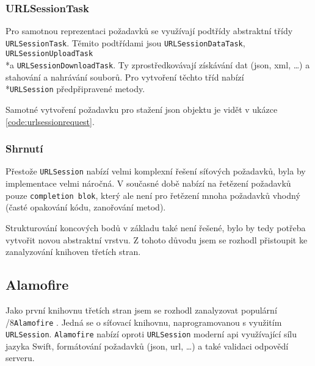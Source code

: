
\subsubsection*{URLSessionTask}

Pro samotnou reprezentaci požadavků se využívají podtřídy abstraktní třídy \texttt{URLSessionTask}.
Těmito podtřídami jsou \texttt{URLSessionDataTask}, \texttt{URLSessionUploadTask}\\*a \texttt{URLSessionDownloadTask}.
Ty zprostředkovávají získávání dat (\acrshort{json}, \acrshort{xml}, \ldots) a stahování a nahrávání souborů.
Pro vytvoření těchto tříd nabízí\\*\texttt{URLSession} předpřipravené metody.

Samotné vytvoření požadavku pro stažení \acrshort{json} objektu je vidět v ukázce \ref{code:urlsessionrequest}.


\subsubsection*{Shrnutí}

Přestože \texttt{URLSession} nabízí velmi komplexní řešení síťových požadavků, byla by implementace velmi náročná.
V současné době nabízí na řetězení požadavků pouze \texttt{completion blok}, který ale není pro řetězení mnoha požadavků vhodný (časté opakování kódu, zanořování metod).

Strukturování koncových bodů v základu také není řešené, bylo by tedy potřeba vytvořit novou abstraktní vrstvu.
Z tohoto důvodu jsem se rozhodl přistoupit ke zanalyzování knihoven třetích stran.

\subsection{Alamofire}

Jako první knihovnu třetích stran jsem se rozhodl zanalyzovat populární\\/8\texttt{Alamofire} \cite{github-alamofire}.
Jedná se o síťovací knihovnu, naprogramovanou s využitím \texttt{URLSession}.
\texttt{Alamofire} nabízí oproti \texttt{URLSession} moderní \acrshort{api} využívající sílu jazyka Swift, formátování požadavků (\acrshort{json}, \acrshort{url}, \ldots) a také validaci odpovědí serveru.

